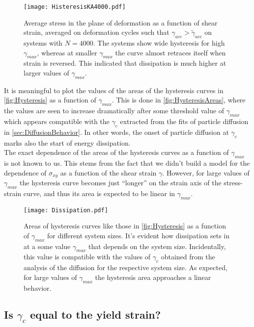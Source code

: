 \begin{figure}[!h] 
\centering 
\texttt{[image: HisteresisKA4000.pdf]} 
\caption{Average stress in the plane of deformation as a function of shear strain, averaged on deformation cycles such that $\gamma_{acc} > \widetilde{\gamma}_{acc}$ on systems with $N=4000$. The systems show wide hysteresis for high $\gamma_{max}$, whereas at smaller $\gamma_{max}$ the curve almost retraces itself when strain is reversed. This indicated that dissipation is much higher at larger values of $\gamma_{max}$. \label{fig:Hysteresis}}
\end{figure}

It is meaningful to plot the values of the areas of the hysteresis curves in \autoref{fig:Hysteresis} as a function of $\gamma_{max}$. This is done in \autoref{fig:HysteresisAreas}, where the values are seen to increase dramatically after some threshold value of $\gamma_{max}$ which appears compatible with the $\gamma_{c}$ extracted from the fits of particle diffusion in \autoref{sec:DiffusionBehavior}. In other words, the onset of particle diffusion at $\gamma_{c}$ marks also the start of energy dissipation. \\
The exact dependence of the areas of the hysteresis curves as a function of $\gamma_{max}$ is not known to us. This stems from the fact that we didn't build a model for the dependence of $\sigma_{xy}$ as a function of the shear strain $\gamma$. However, for large values of $\gamma_{max}$ the hysteresis curve becomes just ``longer'' on the strain axis of the stress-strain curve, and thus its area is expected to be linear in $\gamma_{max}$.

\begin{figure}[!h] 
\centering 
\texttt{[image: Dissipation.pdf]} 
\caption{Areas of hysteresis curves like those in \autoref{fig:Hysteresis} as a function of $\gamma_{max}$ for different system sizes. It's evident how dissipation sets in at a some value $\gamma_{max}$ that depends on the system size. Incidentally, this value is compatible with the values of $\gamma_{c}$ obtained from the analysis of the diffusion for the respective system size. As expected, for large values of $\gamma_{max}$ the hysteresis area approaches a linear behavior. \label{fig:HysteresisAreas}}
\end{figure}

\subsection{Is $\gamma_{c}$ equal to the yield strain?}

